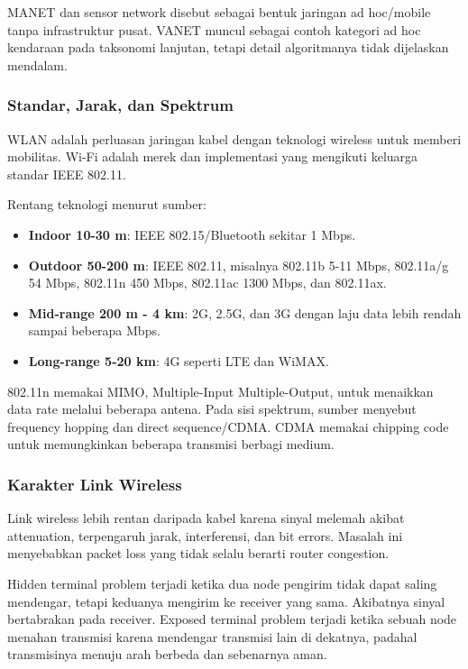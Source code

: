 MANET dan sensor network disebut sebagai bentuk jaringan ad hoc/mobile tanpa infrastruktur pusat. VANET muncul sebagai contoh kategori ad hoc kendaraan pada taksonomi lanjutan, tetapi detail algoritmanya tidak dijelaskan mendalam.

\subsubsection*{Standar, Jarak, dan Spektrum}

WLAN adalah perluasan jaringan kabel dengan teknologi wireless untuk memberi mobilitas. Wi-Fi adalah merek dan implementasi yang mengikuti keluarga standar IEEE 802.11.

Rentang teknologi menurut sumber:

\begin{itemize}
    \item \textbf{Indoor 10-30 m}: IEEE 802.15/Bluetooth sekitar 1 Mbps.
    \item \textbf{Outdoor 50-200 m}: IEEE 802.11, misalnya 802.11b 5-11 Mbps, 802.11a/g 54 Mbps, 802.11n 450 Mbps, 802.11ac 1300 Mbps, dan 802.11ax.
    \item \textbf{Mid-range 200 m - 4 km}: 2G, 2.5G, dan 3G dengan laju data lebih rendah sampai beberapa Mbps.
    \item \textbf{Long-range 5-20 km}: 4G seperti LTE dan WiMAX.
\end{itemize}

802.11n memakai MIMO, Multiple-Input Multiple-Output, untuk menaikkan data rate melalui beberapa antena. Pada sisi spektrum, sumber menyebut frequency hopping dan direct sequence/CDMA. CDMA memakai chipping code untuk memungkinkan beberapa transmisi berbagi medium.

\subsubsection*{Karakter Link Wireless}

Link wireless lebih rentan daripada kabel karena sinyal melemah akibat attenuation, terpengaruh jarak, interferensi, dan bit errors. Masalah ini menyebabkan packet loss yang tidak selalu berarti router congestion.

Hidden terminal problem terjadi ketika dua node pengirim tidak dapat saling mendengar, tetapi keduanya mengirim ke receiver yang sama. Akibatnya sinyal bertabrakan pada receiver. Exposed terminal problem terjadi ketika sebuah node menahan transmisi karena mendengar transmisi lain di dekatnya, padahal transmisinya menuju arah berbeda dan sebenarnya aman.

